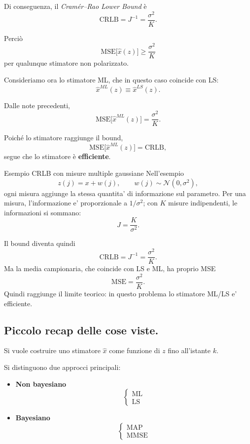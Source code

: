 \documentclass[11pt,a4paper]{article}
\begin{document}
Di conseguenza, il \emph{Cram\'er--Rao Lower Bound} è
\[
\mathrm{CRLB}
=
J^{-1}
=
\frac{\sigma^2}{K}.
\]

Perciò
\[
\mathrm{MSE}\bigl[\hat x(z)\bigr]\geq \frac{\sigma^2}{K}
\]
per qualunque stimatore non polarizzato.

\vspace{0.5em}

Consideriamo ora lo stimatore ML, che in questo caso coincide con LS:
\[
\hat x^{ML}(z)\equiv \hat x^{LS}(z).
\]

Dalle note precedenti,
\[
\mathrm{MSE}\bigl[\hat x^{ML}(z)\bigr]
=
\frac{\sigma^2}{K}.
\]

Poiché lo stimatore raggiunge il bound,
\[
\mathrm{MSE}\bigl[\hat x^{ML}(z)\bigr]=\mathrm{CRLB},
\]
segue che lo stimatore è \textbf{efficiente}.

\begin{spiegazione}{Esempio CRLB con misure multiple gaussiane}
Nell'esempio
\[
z(j)=x+w(j),
\qquad w(j)\sim\mathcal N(0,\sigma^2),
\]
ogni misura aggiunge la stessa quantita' di informazione sul parametro. Per una misura, l'informazione e' proporzionale a $1/\sigma^2$; con $K$ misure indipendenti, le informazioni si sommano:
\[
J=\frac{K}{\sigma^2}.
\]

Il bound diventa quindi
\[
\mathrm{CRLB}=J^{-1}=\frac{\sigma^2}{K}.
\]
Ma la media campionaria, che coincide con LS e ML, ha proprio MSE
\[
\mathrm{MSE}=\frac{\sigma^2}{K}.
\]
Quindi raggiunge il limite teorico: in questo problema lo stimatore ML/LS e' efficiente.
\end{spiegazione}

\subsection*{Piccolo recap delle cose viste.}

Si vuole costruire uno stimatore $\hat x$ come funzione di \(z\) fino all'istante \(k\).

Si distinguono due approcci principali:

\begin{itemize}
    \item \textbf{Non bayesiano}
    \[
    \begin{cases}
    \text{ML} \\
    \text{LS}
    \end{cases}
    \]

    \item \textbf{Bayesiano}
    \[
    \begin{cases}
    \text{MAP} \\
    \text{MMSE}
    \end{cases}
    \]
\end{itemize}
\end{document}
